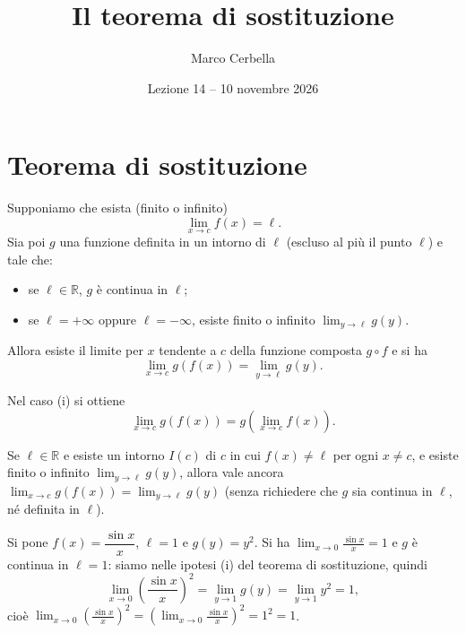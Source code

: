 \documentclass[11pt,a4paper]{article}
\title{Il teorema di sostituzione}
\author{Marco Cerbella}
\date{Lezione 14 -- 10 novembre 2026}
\begin{document}
\maketitle

\section{Teorema di sostituzione}

\begin{teorema}
Supponiamo che esista (finito o infinito)
\[
  \lim_{x\to c} f(x) = \ell .
\]
Sia poi $g$ una funzione definita in un intorno di $\ell$ (escluso al più il punto $\ell$) e tale che:
\begin{itemize}
  \item[(i)] se $\ell \in \mathbb{R}$, $g$ è continua in $\ell$;
  \item[(ii)] se $\ell = +\infty$ oppure $\ell = -\infty$, esiste finito o infinito $\displaystyle\lim_{y\to\ell} g(y)$.
\end{itemize}
Allora esiste il limite per $x$ tendente a $c$ della funzione composta $g\circ f$ e si ha
\[
  \lim_{x\to c} g(f(x)) = \lim_{y\to\ell} g(y).
\]
\end{teorema}

Nel caso (i) si ottiene
\[
  \lim_{x\to c} g(f(x)) = g\!\left(\lim_{x\to c} f(x)\right).
\]

\begin{osservazione}[Variante (i$'$)]
Se $\ell \in \mathbb{R}$ e esiste un intorno $I(c)$ di $c$ in cui $f(x) \neq \ell$ per ogni $x \neq c$, e esiste finito o infinito $\displaystyle\lim_{y\to\ell} g(y)$, allora vale ancora $\displaystyle\lim_{x\to c} g(f(x)) = \lim_{y\to\ell} g(y)$ (senza richiedere che $g$ sia continua in $\ell$, né definita in $\ell$).
\end{osservazione}

\begin{esempio}
Si pone $f(x) = \dfrac{\sin x}{x}$, $\ell = 1$ e $g(y) = y^2$. Si ha $\displaystyle\lim_{x\to 0}\frac{\sin x}{x} = 1$ e $g$ è continua in $\ell = 1$: siamo nelle ipotesi (i) del teorema di sostituzione, quindi
\[
  \lim_{x\to 0}\left(\frac{\sin x}{x}\right)^{2} = \lim_{y\to 1} g(y) = \lim_{y\to 1} y^2 = 1,
\]
cioè $\displaystyle\lim_{x\to 0}\left(\frac{\sin x}{x}\right)^{2} = \left(\lim_{x\to 0}\frac{\sin x}{x}\right)^{2} = 1^2 = 1$.
\end{esempio}
\end{document}
